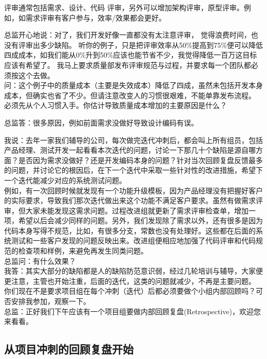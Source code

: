 评审通常包括需求、设计、代码
评审，另外可以增加架构评审，原型评审。例如，如需求评审有客户参与，效率/效果都会更好。

总监开心地说：对了，我们开发好像一直都没有太注意评审，
觉得浪费时间，也没有评审出多少缺陷。
听你的例子，只是把评审效率从50\%提高到75\%便可以降低四成成本，如我们能从0\%升到50\%应该也能节省不少，我觉得降低一百万这目标应该有希望了。
我马上要求质量部发布评审规范与过程，并要求每一个团队都必须按这个去做。\\
问：这个例子中的质量成本（主要是失效成本）降低了四成，虽然未包括开发本身成本，但确实也省了不少。但请注意改变人的习惯很艰难，不能单靠发布流程。
必须先从个人习惯入手。你估计导致质量成本增加的主要原因是什么？

总监答：很多原因，例如前面需求没做好导致设计编码有误。

我说：去年一家我们辅导的公司，每次做完迭代冲刺后，都会叫上所有组员，包括产品经理、测试开发一起看看本次迭代的问题，讨论一下那几十个缺陷是源自哪方面？是否因为需求没做好？还是开发编码本身的问题？针对当次回顾复盘反馈最多的问题，并讨论它的根因后，在下一个迭代中采取一些针对性的改进措施，希望下一个迭代能减少对应的系统测试问题。\\
例如，有一次回顾时候就发现有一个功能升级模板，因为产品经理没有把握好客户的实际要求，导致我们那次迭代做出来这个功能不满足客户要求。虽然有做需求评审，但大家未能发现这需求问题。过程改进组就更新了需求评审检查单，增加一项，希望以后会减少同样的问题。另外，我们发现除了需求以外，还有很多是因为代码本身写得不规范，比如，有很多分支，常数也没有处理好。这些都在后面的系统测试和一些客户发现的问题反映出来。改进组便相应地加强了代码评审和代码规范的检查项和样例，来避免再发生同类问题。\\
总监问：有什么效果？\\
我答：其实大部分的缺陷都是人的缺陷防范意识弱，经过几轮培训与辅导，大家便更注意，主管也开始注重，后面的迭代，这类的问题就减少，不再是主要问题。\\
你们现在不是要求项目组在每个冲刺（迭代）后都必须要做个小组内部回顾吗？可否安排我参加，观察一下。\\
总监：正好我们下午应该有一个项目组要做内部回顾复盘(Retrospective)，欢迎您来看看。

\hypertarget{ux4eceux9879ux76eeux51b2ux523aux7684ux56deux987eux590dux76d8ux5f00ux59cb}{%
\subsection{从项目冲刺的回顾复盘开始}\label{ux4eceux9879ux76eeux51b2ux523aux7684ux56deux987eux590dux76d8ux5f00ux59cb}}

